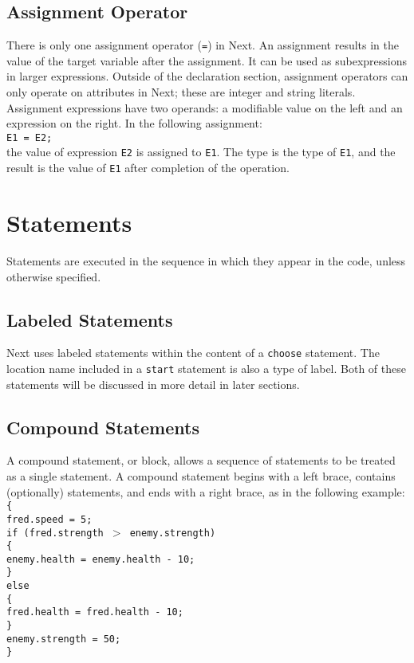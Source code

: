 \documentclass[12pt]{article}
\begin{document}
\subsection{Assignment Operator}
There is only one assignment operator (\texttt{=}) in Next.  An assignment results in the value of the target variable after the assignment.  It can be used as subexpressions in larger expressions.  Outside of the declaration section, assignment operators can only operate on attributes in Next; these are integer and string literals.  Assignment expressions have two operands: a modifiable value on the left and an expression on the right.  In the following assignment: \\

\texttt{E1 = E2;} \\

\noindent the value of expression \texttt{E2} is assigned to \texttt{E1}.  The type is the type of \texttt{E1}, and the result is the value of \texttt{E1} after completion of the operation.

\section{Statements}
Statements are executed in the sequence in which they appear in the code, unless otherwise specified.

\subsection{Labeled Statements}
Next uses labeled statements within the content of a \texttt{choose} statement.  The location name included in a \texttt{start} statement is also a type of label.  Both of these statements will be discussed in more detail in later sections.

\subsection{Compound Statements}
A compound statement, or block, allows a sequence of statements to be treated as a single statement.  A compound statement begins with a left brace, contains (optionally) statements, and ends with a right brace, as in the following example: \\

\noindent \texttt{\{ \\
\indent fred.speed = 5; \\
\indent if (fred.strength $>$ enemy.strength) \\
\indent \{ \\
\indent \indent enemy.health = enemy.health - 10;  \\
\indent \} \\
\indent else \\
\indent \{ \\
\indent \indent fred.health = fred.health - 10; \\
\indent \} \\
\indent enemy.strength = 50; \\
\} }
\end{document}

